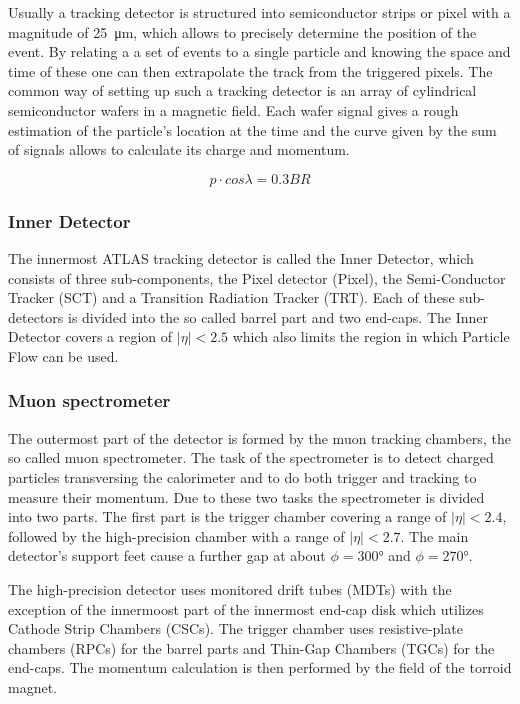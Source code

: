 Usually a tracking detector is structured into semiconductor strips or pixel with a magnitude of \SI{25}{\micro \metre}, which allows to precisely determine the position of the event. By relating a a set of events to a single particle and knowing the space and time of these one can then extrapolate the track from the triggered pixels. The common way of setting up such a tracking detector is an array of cylindrical semiconductor wafers in a magnetic field. Each wafer signal gives a rough estimation of the particle's location at the time and the curve given by the sum of signals allows to calculate its charge and momentum.

\begin{equation}
p \cdot cos \lambda = 0.3 BR
\end{equation}


\subsubsection{Inner Detector}

The innermost ATLAS tracking detector is called the Inner Detector, which consists of three sub-components, the Pixel detector (Pixel), the Semi-Conductor Tracker (SCT) and a Transition Radiation Tracker (TRT). Each of these sub-detectors is divided into the so called barrel part and two end-caps. The Inner Detector covers a region of $|\eta| < \num{2.5}$ which also limits the region in which Particle Flow can be used.

\subsubsection{Muon spectrometer}

The outermost part of the detector is formed by the muon tracking chambers, the so called muon spectrometer. The task of the spectrometer is to detect charged particles transversing the calorimeter and to do both trigger and tracking to measure their momentum. Due to these two tasks the spectrometer is divided into two parts. The first part is the trigger chamber covering a range of $|\eta|<2.4$, followed by the high-precision chamber with a range of $|\eta|<2.7$. The main detector's support feet cause a further gap at about $\phi = \ang{300}$ and $\phi = \ang{270}$. 

The high-precision detector uses monitored drift tubes (MDTs) with the exception of the innermoost part of the innermost end-cap disk which utilizes Cathode Strip Chambers (CSCs). The trigger chamber uses resistive-plate chambers (RPCs) for the barrel parts and Thin-Gap Chambers (TGCs) for the end-caps. The momentum calculation is then performed by the field of the torroid magnet.

